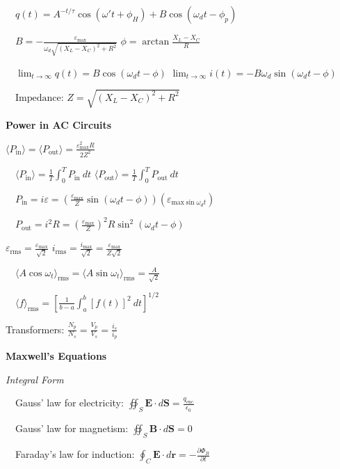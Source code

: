 \documentclass[twocolumn]{article}
\begin{document}
$\quad q(t) = A ^{-t/ \tau} \cos(\omega' t + \phi_H) + B \cos(\omega_d t - \phi_p)$

$\quad B = - \frac{\varepsilon_{\text{max}}}{\omega_d \sqrt{(X_L - X_C)^2 + R^2}}$ \hfill $\phi = \arctan \frac{X_L-X_C}{R}$

$\quad \lim_{t \to \infty} q(t) = B \cos( \omega_d t - \phi )$ \hfill $\lim_{t \to \infty} i(t) = -B \omega_d \sin( \omega_d t - \phi )$

$\quad \text{Impedance: } Z = \sqrt{(X_L - X_C)^2 + R^2}$

\dotfill

\textbf{Power in AC Circuits}

$\langle P_{\text{in}} \rangle = \langle P_{\text{out}} \rangle = \frac{\varepsilon_{\text{max}}^2 R}{2 Z^2}$

$\quad \langle P_{\text{in}} \rangle = \frac{1}{T} \int_0^T P_{\text{in}}\ dt$ \hfill $\langle P_{\text{out}} \rangle = \frac{1}{T} \int_0^T P_{\text{out}}\ dt$

$\quad P_{\text{in}} = i \varepsilon = \left( \frac{\varepsilon_{\text{max}}}{Z} \sin (\omega_d t - \phi) \right) (\varepsilon_{\text{max} \sin \omega_d t})$

$\quad P_{\text{out}} = i^2 R = \left( \frac{\varepsilon_{\text{max}}}{Z} \right)^2 R \sin^2 (\omega_d t - \phi)$

$\varepsilon_{\text{rms}} = \frac{\varepsilon_{\text{max}}}{\sqrt{2}}$ \hfill $i_{\text{rms}} = \frac{i_{\text{max}}}{\sqrt{2}} = \frac{\varepsilon_{\text{max}}}{Z \sqrt{2}}$

$\quad \langle A \cos \omega_t \rangle_{\text{rms}} = \langle A \sin \omega_t \rangle_{\text{rms}} = \frac{A}{\sqrt{2}}$

$\quad \langle f \rangle_{\text{rms}} = \left[ \frac{1}{b-a} \int_a^b [f(t)]^2\ dt \right]^{1/2}$

Transformers: $\frac{N_p}{N_s} = \frac{V_p}{V_s} = \frac{i_s}{i_p}$

\dotfill

\textbf{Maxwell's Equations}

\textit{Integral Form}

$\quad$Gauss' law for electricity: $\oiint_S \mathbf{E} \cdot d\mathbf{S} = \frac{q_{\text{enc}}}{\epsilon_0}$

$\quad$Gauss' law for magnetism: $\oiint_S \mathbf{B} \cdot d \mathbf{S} = 0$

$\quad$Faraday's law for induction: $\oint_C \mathbf{E} \cdot d\mathbf{r} = -\frac{\partial \Phi_B}{\partial t}$
\end{document}
